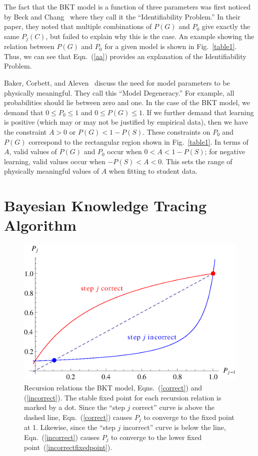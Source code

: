 \documentclass{acmlarge-edm}
\begin{document}
The fact that the BKT model is a function of three parameters
was first noticed by Beck and Chang~\cite{beck_identifiability:_2007} 
where they call it the ``Identifiability Problem.''   In their paper, 
they noted that multiple
combinations of $P(G)$ and $P_0$ give exactly the same $P_j(C)$, but
failed to explain why this is the case.  An example showing the relation
between $P(G)$ and $P_0$ for a given model is shown in Fig.~\ref{table1}.
Thus, we can see that Eqn.~(\ref{aa}) provides an explanation of the
Identifiability Problem.

Baker, Corbett, and Aleven~\cite{baker_more_2008} discuss the need for 
model parameters to be physically meaningful.  They call this 
``Model Degeneracy.''   For example, all probabilities should lie between zero and one.  
In the case of the BKT model, we demand that $0\le P_0\le 1$ and
 $0\le P(G) \le 1$.
If we further demand that learning is positive (which may or may not be justified
by empirical data), then we have the constraint $A>0$ or $P(G)<1-P(S)$.
These constraints on $P_0$ and $P(G)$ correspond to the rectangular region shown in Fig.~\ref{table1}.
In terms of $A$, valid values of $P(G)$ and $P_0$ occur when
$0<A<1-P(S)$; for negative learning, valid values occur when
$-P(S)<A<0$.  This sets the range of physically meaningful values of
$A$ when fitting to student data.

\section{Bayesian Knowledge Tracing Algorithm}

\begin{figure}
\centering\includegraphics{p-recursion.eps}
\caption{
  Recursion relations the BKT model, Eqns.~(\ref{correct}) and 
  (\ref{incorrect}).
  The stable fixed point for each recursion relation is marked
  by a dot.  Since the ``step $j$ correct'' curve is above the
  dashed line, Eqn.~(\ref{correct}) causes $P_j$ to 
   converge to the fixed point at 1.  Likewise, since 
   the ``step $j$ incorrect'' curve is below the line, 
   Eqn.~(\ref{incorrect}) causes $P_j$ to converge 
   to the lower fixed point~(\ref{incorrectfixedpoint}).
 }
 \label{p-recursion}
\end{figure}
\end{document}

